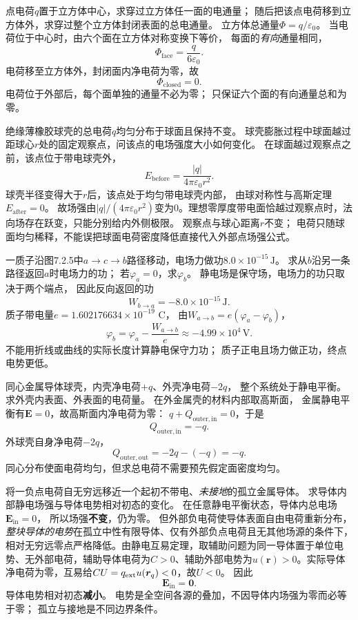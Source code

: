 \problemtext 点电荷$q$置于立方体中心，求穿过立方体任一面的电通量；
随后把该点电荷移到立方体外，求穿过整个立方体封闭表面的总电通量。
\workings
立方体总通量$\Phi=q/\varepsilon_0$。
当电荷位于中心时，由六个面在立方体对称变换下等价，
每面的\emph{有向}通量相同，
\[
\boxed{\Phi_{\mathrm{face}}=\frac{q}{6\varepsilon_0}}.
\]
电荷移至立方体外，封闭面内净电荷为零，故
\[
\boxed{\Phi_{\mathrm{closed}}=0}.
\]
\crosscheck 电荷位于外部后，每个面单独的通量不必为零；
只保证六个面的有向通量总和为零。

\problemtext 绝缘薄橡胶球壳的总电荷$q$均匀分布于球面且保持不变。
球壳膨胀过程中球面越过距球心$r$处的固定观察点，问该点的电场强度大小如何变化。
\workings
在球面越过观察点之前，该点位于带电球壳外，
\[
E_{\mathrm{before}}=\frac{|q|}{4\pi\varepsilon_0r^2}.
\]
球壳半径变得大于$r$后，该点处于均匀带电球壳内部，
由球对称性与高斯定理
$\boxed{E_{\mathrm{after}}=0}$。
故场强由$\boxed{|q|/(4\pi\varepsilon_0r^2)}$变为$\boxed{0}$。理想零厚度带电面恰越过观察点时，法向场存在跃变，只能分别给内外侧极限。
\crosscheck 观察点与球心距离$r$不变；
电荷只随球面均匀稀释，不能误把球面电荷密度降低直接代入外部点场强公式。

\problemtext 一质子沿图7.2.5中$a\to c\to b$路径移动，电场力做功$8.0\times10^{-15}\,\mathrm J$。
求从$b$沿另一条路径返回$a$时电场力的功；
若$\varphi_a=0$，求$\varphi_b$。
\workings
静电场是保守场，电场力的功只取决于两个端点，
因此反向返回的功
\[
\boxed{W_{b\to a}=-8.0\times10^{-15}\,\mathrm J}.
\]
质子带电量$e=1.602176634\times10^{-19}$ C，
由$W_{a\to b}=e(\varphi_a-\varphi_b)$，
\[
\boxed{\varphi_b=\varphi_a-\frac{W_{a\to b}}e
\approx-4.99\times10^4\,\mathrm V}.
\]
\crosscheck 不能用折线或曲线的实际长度计算静电保守力功；
质子正电且场力做正功，终点电势更低。

\problemtext 同心金属导体球壳，内壳净电荷$+q$、外壳净电荷$-2q$，
整个系统处于静电平衡。求外壳内表面、外表面的电荷量。
\workings
在外金属壳的材料内部取高斯面，
金属静电平衡有$\bm E=0$，故高斯面内净电荷为零：
$q+Q_{\mathrm{outer,in}}=0$，于是
\[
\boxed{Q_{\mathrm{outer,in}}=-q}.
\]
外球壳自身净电荷$-2q$，
\[
\boxed{Q_{\mathrm{outer,out}}=-2q-(-q)=-q}.
\]
\crosscheck 同心分布使面电荷均匀，但求总电荷不需要预先假定面密度均匀。

\problemtext 将一负点电荷自无穷远移近一个起初不带电、\emph{未接地}的孤立金属导体。
求导体内部静电场强与导体电势相对初态的变化。
\workings
在任意静电平衡状态，导体内总电场$\bm E_{\mathrm{in}}=0$，
所以场强\textbf{不变}，仍为零。
但外部负电荷使导体表面自由电荷重新分布，
\emph{整块导体的电势}在孤立中性有限导体、仅有外部负点电荷且无其他场源的条件下，相对无穷远零点严格降低。由静电互易定理，取辅助问题为同一导体置于单位电势、无外部电荷，辅助导体电荷为$C>0$、辅助外部电势为$u(\bm r)>0$。实际导体净电荷为零，互易给$CU=q_{\rm ext}u(\bm r_q)<0$，故$U<0$。
因此
\[
\boxed{\bm E_{\mathrm{in}}=\bm0}.
\]
导体电势相对初态\textbf{减小}。
\crosscheck 电势是全空间各源的叠加，不因导体内场强为零而必等于零；
孤立与接地是不同边界条件。


